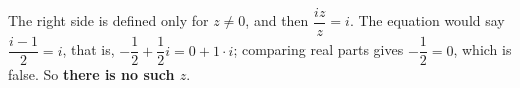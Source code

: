 The right side is defined only for $z\ne0$, and then $\dfrac{iz}{z}=i$. The equation would say $\dfrac{i-1}{2}=i$, that is, $-\dfrac{1}{2}+\dfrac{1}{2}i=0+1\cdot i$; comparing real parts gives $-\dfrac{1}{2}=0$, which is false. So \textbf{there is no such $z$}.
